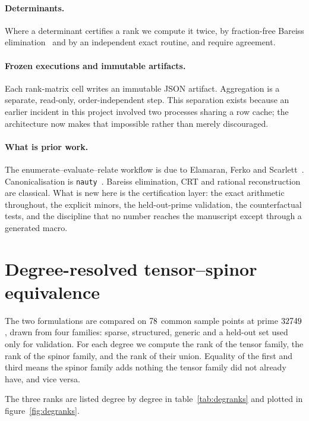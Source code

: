 \documentclass[11pt,a4paper]{article}
\theoremstyle{definition}
\theoremstyle{remark}
\begin{document}
\paragraph{Determinants.}
Where a determinant certifies a rank we compute it twice, by fraction-free
Bareiss elimination~\cite{Bareiss:1968} and by an independent exact routine, and
require agreement.

\paragraph{Frozen executions and immutable artifacts.}
Each rank-matrix cell writes an immutable JSON artifact. Aggregation is a
separate, read-only, order-independent step. This separation exists because an
earlier incident in this project involved two processes sharing a row cache; the
architecture now makes that impossible rather than merely discouraged.

\paragraph{What is prior work.}
The enumerate--evaluate--relate workflow is due to Elamaran, Ferko and
Scarlett~\cite{Elamaran:2025mlinv}. Canonicalisation is
\texttt{nauty}~\cite{McKay:2013}. Bareiss elimination, CRT and rational
reconstruction are classical. What is new here is the certification layer: the
exact arithmetic throughout, the explicit minors, the held-out-prime validation,
the counterfactual tests, and the discipline that no number reaches the
manuscript except through a generated macro.

\section{Degree-resolved tensor--spinor equivalence}
\label{sec:equivalence}

The two formulations are compared on $78$ common sample points at
prime $32749$, drawn from four families: sparse, structured, generic
and a held-out set used only for validation. For each degree we compute the rank
of the tensor family, the rank of the spinor family, and the rank of their union.
Equality of the first and third means the spinor family adds nothing the tensor
family did not already have, and vice versa.

The three ranks are listed degree by degree in table~\ref{tab:degranks} and
plotted in figure~\ref{fig:degranks}.
\end{document}

